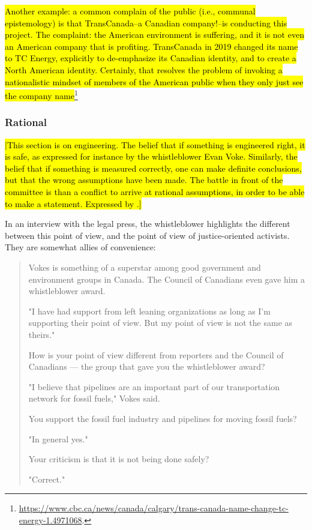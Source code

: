 \documentclass{article}
\begin{document}
	\hl{Another example: a common complain of the public (i.e., communal epistemology) is that TransCanada--a Canadian company!--is conducting this project. The complaint: the American environment is suffering, and it is not even an American company that is profiting. TransCanada in 2019 changed its name to TC Energy, explicitly to de-emphasize its Canadian identity, and to create a North American identity. Certainly, that resolves the problem of invoking a nationalistic mindset of members of the American public when they only just see the company name}\footnote{\url{https://www.cbc.ca/news/canada/calgary/trans-canada-name-change-tc-energy-1.4971068}.}

	\subsubsection*{Rational}

	\hl{[This section is on engineering. The belief that if something is engineered right, it is safe, as expressed for instance by the whistleblower Evan Voke. Similarly, the belief that if something is measured correctly, one can make definite conclusions, but that the wrong assumptions have been made. The battle in front of the committee is than a conflict to arrive at rational assumptions, in order to be able to make a statement. Expressed by \mbox{\citet{Stansbury2011}}.]}

	In an interview with the legal press, the whistleblower highlights the different between this point of view, and the point of view of justice-oriented activists. They are somewhat allies of convenience:

	\begin{quote}
		Vokes is something of a superstar among good government and environment groups in Canada. The Council of Canadians even gave him a whistleblower award. 

		"I have had support from left leaning organizations as long as I'm supporting their point of view. But my point of 	view is not the same as theirs." 

		How is your point of view different from reporters and the Council of Canadians — the group that gave you the whistleblower award? 

		"I believe that pipelines are an important part of our transportation network for fossil fuels," Vokes said.

		You support the fossil fuel industry and pipelines for moving fossil fuels?

		"In general yes." 

		Your criticism is that it is not being done safely? 

		"Correct." 

		\citep{CorporateCrimeReporter2017}
	\end{quote}
\end{document}
